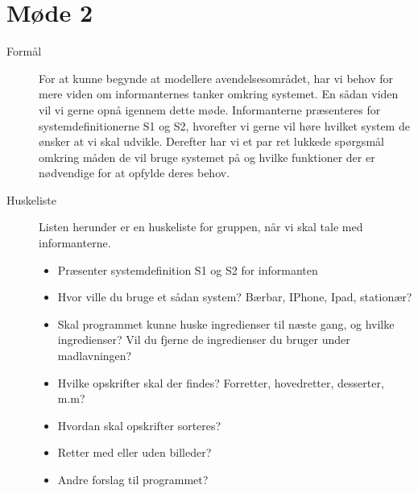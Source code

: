 \section{Møde 2}

\begin{description}

\item[Formål]
For at kunne begynde at modellere avendelsesområdet, har vi behov for mere viden om informanternes tanker omkring systemet. En sådan viden vil vi gerne opnå igennem dette møde. Informanterne præsenteres for systemdefinitionerne S1 og S2, hvorefter vi gerne vil høre hvilket system de ønsker at vi skal udvikle. Derefter har vi et par ret lukkede spørgsmål omkring måden de vil bruge systemet på og hvilke funktioner der er nødvendige for at opfylde deres behov.

\item[Huskeliste] Listen herunder er en huskeliste for gruppen, når vi skal tale med informanterne.

\begin{itemize}[noitemsep]
\item Præsenter systemdefinition S1 og S2 for informanten
\item Hvor ville du bruge et sådan system? Bærbar, IPhone, Ipad, stationær?
\item Skal programmet kunne huske ingredienser til næste gang, og hvilke ingredienser? Vil du fjerne de ingredienser du bruger under madlavningen?
\item Hvilke opskrifter skal der findes? Forretter, hovedretter, desserter, m.m?
\item Hvordan skal opskrifter sorteres?
\item Retter med eller uden billeder?
\item Andre forslag til programmet?
\end{itemize}


\end{description}
